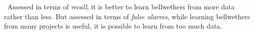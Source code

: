 \documentclass[10pt,journal,compsoc]{IEEEtran}
\newenvironment{RQ}[1]%
{\noindent\begin{minipage}[c]{\linewidth}%
\begin{bclogo}[couleur=gray!20,%
                arrondi=0.1,logo=\bctrombone,%
                ombre=true%
                ]{{\small  ~#1}}}%
{\end{bclogo}\vspace{2mm}\end{minipage}}
\begin{document}
\begin{RQ}
{Assessed in terms of {\em recall},
it is better to learn bellwethers from more data rather than less.
But assessed in terms of {\em false alarms}, 
while learning bellwethers
from many projects is useful, it is possible to learn from too much data.} 
\end{RQ}


\end{document}
